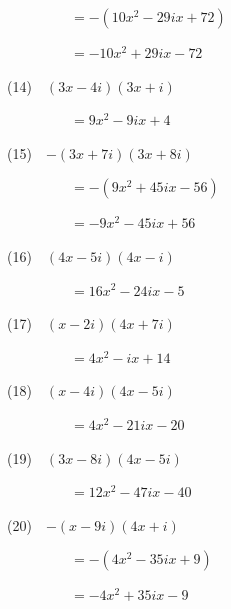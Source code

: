 \documentclass[a4j,twocolumn,10pt,fleqn]{jarticle}
\begin{document}
~~~~~~~~~$=-(10 x^{2} - 29 i x + 72)$

~~~~~~~~~$=- 10 x^{2} + 29 i x - 72$

(14)~~$\left(3 x - 4 i\right) \left(3 x + i\right)$

~~~~~~~~~$=9 x^{2} - 9 i x + 4$

(15)~~$-\left(3 x + 7 i\right) \left(3 x + 8 i\right)$

~~~~~~~~~$=-(9 x^{2} + 45 i x - 56)$

~~~~~~~~~$=- 9 x^{2} - 45 i x + 56$

(16)~~$\left(4 x - 5 i\right) \left(4 x - i\right)$

~~~~~~~~~$=16 x^{2} - 24 i x - 5$

(17)~~$\left(x - 2 i\right) \left(4 x + 7 i\right)$

~~~~~~~~~$=4 x^{2} - i x + 14$

(18)~~$\left(x - 4 i\right) \left(4 x - 5 i\right)$

~~~~~~~~~$=4 x^{2} - 21 i x - 20$

(19)~~$\left(3 x - 8 i\right) \left(4 x - 5 i\right)$

~~~~~~~~~$=12 x^{2} - 47 i x - 40$

(20)~~$-\left(x - 9 i\right) \left(4 x + i\right)$

~~~~~~~~~$=-(4 x^{2} - 35 i x + 9)$

~~~~~~~~~$=- 4 x^{2} + 35 i x - 9$
\end{document}
